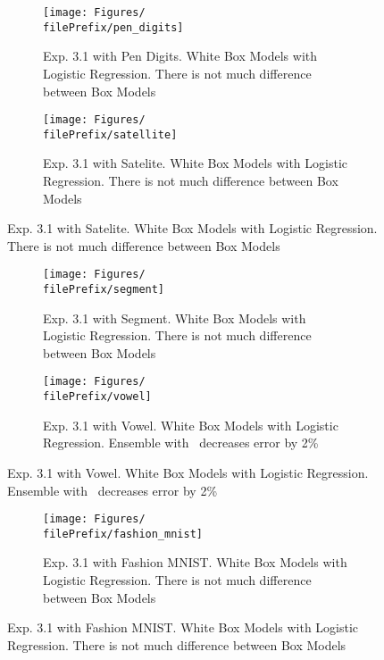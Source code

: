 \begin{figure}[ht]
  \centering
  \begin{subfigure}[t]{0.5\linewidth}
    \centering\captionsetup{width=.8\linewidth}\texttt{[image: Figures/\\filePrefix/pen\_digits]}
    \caption{Exp. 3.1 with Pen Digits. White Box Models with Logistic Regression. There is not much difference between Box Models}
    \label{fig:\undPrefix_pen_digits}
  \end{subfigure}%
  \begin{subfigure}[t]{0.5\linewidth}
    \centering\captionsetup{width=.8\linewidth}\texttt{[image: Figures/\\filePrefix/satellite]}
    \caption{Exp. 3.1 with Satelite. White Box Models with Logistic Regression. There is not much difference between Box Models}
    \label{fig:\undPrefix_satellite}
  \end{subfigure}
\end{figure}

\begin{figure}[ht]
  \centering
  \begin{subfigure}[t]{0.5\linewidth}
    \centering\captionsetup{width=.8\linewidth}\texttt{[image: Figures/\\filePrefix/segment]}
    \caption{Exp. 3.1 with Segment. White Box Models with Logistic Regression. There is not much difference between Box Models}
    \label{fig:\undPrefix_segment}
  \end{subfigure}%
  \begin{subfigure}[t]{0.5\linewidth}
    \centering\captionsetup{width=.8\linewidth}\texttt{[image: Figures/\\filePrefix/vowel]}
    \caption{Exp. 3.1 with Vowel. White Box Models with Logistic Regression.
    Ensemble with \Nys\ decreases error by 2\%}
    \label{fig:\undPrefix_vowel}
  \end{subfigure}
\end{figure}


\begin{figure}[ht]
  \centering
  \begin{subfigure}[t]{0.5\linewidth}
    \centering\captionsetup{width=.8\linewidth}\texttt{[image: Figures/\\filePrefix/fashion\_mnist]}
    \caption{Exp. 3.1 with Fashion MNIST. White Box Models with Logistic Regression. There is not much difference between Box Models}
    \label{fig:\undPrefix_segment}
  \end{subfigure}%
\end{figure}


\let\major\undefined
\let\minor\undefined

\let\undPrefix\undefined
\let\dotPrefix\undefined
\let\scoPrefix\undefined

\let\filePrefix\undefined
